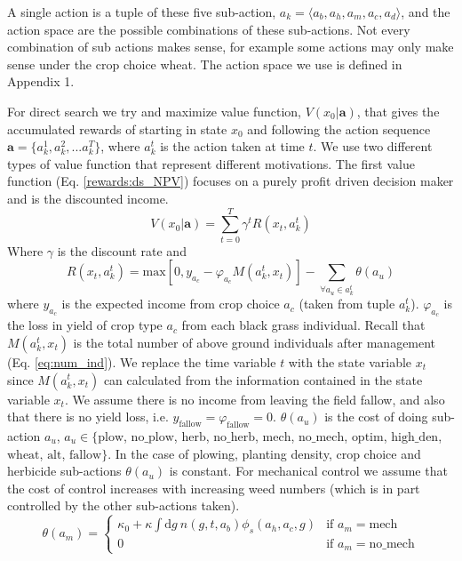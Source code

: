 \documentclass[12pt, a4paper]{article}
\begin{document}
A single action is a tuple of these five sub-action, $a_k = \langle a_b, a_h, a_m, a_c, a_d \rangle$, and the action space are the possible combinations of these sub-actions. Not every combination of sub actions makes sense, for example some actions may only make sense under the crop choice wheat. The action space we use is defined in Appendix 1.

For direct search we try and maximize value function, $V(x_0|\mathbf{a})$, that gives the accumulated rewards of starting in state $x_0$ and following the action sequence $\mathbf{a} = \{a_k^1, a_k^2, ... a_k^T\}$, where $a_k^t$ is the action taken at time $t$. We use two different types of value function that represent different motivations. The first value function (Eq. \ref{rewards:ds_NPV}) focuses on a purely profit driven decision maker and is the discounted income. 
\begin{equation}\label{rewards:ds_NPV}
	V(x_0|\mathbf{a}) = \sum_{t = 0}^{T} \gamma^t R(x_t, a_k^t) 
\end{equation}
Where $\gamma$ is the discount rate and 
\begin{equation}\label{rewards:immediate}
	R(x_t, a_k^t) = \text{max}\left[0, y_{a_c} - \varphi_{a_c} M(a_k^t, x_t)\right] - \sum_{\forall a_u \in a_k^t} \theta(a_u)  
\end{equation}
where $y_{a_c}$ is the expected income from crop choice $a_c$ (taken from tuple $a_k^t$). $\varphi_{a_c}$ is the loss in yield of crop type $a_c$ from each black grass individual. Recall that $M(a_k^t, x_t)$ is the total number of above ground individuals after management (Eq. \ref{eq:num_ind}). We replace the time variable $t$ with the state variable $x_t$ since $M(a_k^t, x_t)$ can calculated from the information contained in the state variable $x_t$. We assume there is no income from leaving the field fallow, and also that there is no yield loss, i.e. $y_\text{fallow} = \varphi_\text{fallow} = 0$. $\theta(a_u)$ is the cost of doing sub-action $a_u$, $a_u \in \{\text{plow}$, $\text{no\_plow}$, $\text{herb}$, $\text{no\_herb}$, $\text{mech}$, $\text{no\_mech}$, $\text{optim}$, $\text{high\_den}$, $\text{wheat}$, $\text{alt}$, $\text{fallow}\}$. In the case of plowing, planting density, crop choice and herbicide sub-actions $\theta(a_u)$ is constant. For mechanical control we assume that the cost of control increases with increasing weed numbers (which is in part controlled by the other sub-actions taken).
\begin{equation}\label{eq:cost_mech}
	\theta(a_m) = \begin{cases}
	\kappa_0 + \kappa \int \text{d}g~ n(g, t, a_b)\phi_s(a_h, a_c, g) &\text{if } a_m = \text{mech}\\
	0 &\text{if } a_m = \text{no\_mech}
	\end{cases} 
\end{equation}    
\end{document}
